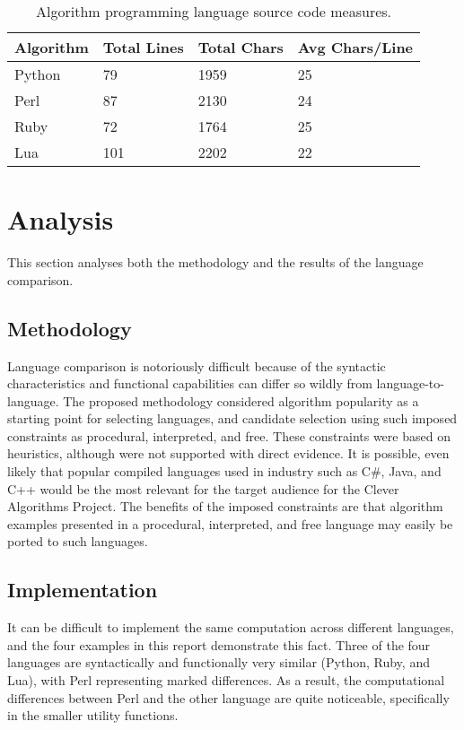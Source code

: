 \documentclass[a4paper, 11pt]{article}
\begin{document}
\begin{table}[ht]
	\centering
		\begin{tabularx}{\textwidth}{lXXX}
		\toprule
		\textbf{Algorithm} & \textbf{Total Lines} & \textbf{Total Chars} & \textbf{Avg Chars/Line} \\ 
		\toprule
		Python & 79 & 1959 & 25 \\
		Perl & 87 & 2130 & 24 \\		
		Ruby & 72 & 1764 & 25 \\
		Lua & 101 & 2202 & 22 \\
		\bottomrule
		\end{tabularx}	
	\caption{Algorithm programming language source code measures.}
	\label{tab:implementation_results}
\end{table}

% 
% 
\section{Analysis}
\label{sec:analysis}
This section analyses both the methodology and the results of the language comparison.

% 
% 
\subsection{Methodology}
Language comparison is notoriously difficult because of the syntactic characteristics and functional capabilities can differ so wildly from language-to-language. 
The proposed methodology considered algorithm popularity as a starting point for selecting languages, and candidate selection using such imposed constraints as procedural, interpreted, and free. These constraints were based on heuristics, although were not supported with direct evidence. 
It is possible, even likely that popular compiled languages used in industry such as C\#, Java, and C++ would be the most relevant for the target audience for the Clever Algorithms Project. 
The benefits of the imposed constraints are that algorithm examples presented in a procedural, interpreted, and free language may easily be ported to such languages.


% 
% 
\subsection{Implementation}
It can be difficult to implement the same computation across different languages, and the four examples in this report demonstrate this fact. 
Three of the four languages are syntactically and functionally very similar (Python, Ruby, and Lua), with Perl representing marked differences. As a result, the computational differences between Perl and the other language are quite noticeable, specifically in the smaller utility functions.
\end{document}
